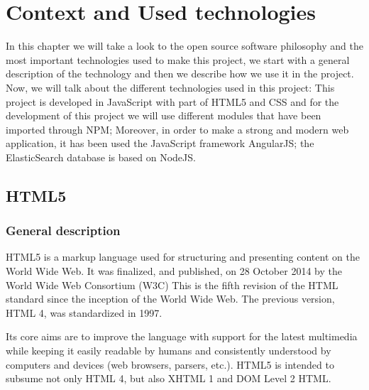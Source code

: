\documentclass[a4paper, 12pt]{book}
\begin{document}


\chapter{Context and Used technologies}

In this chapter we will take a look to the open source software philosophy and the most important technologies used to make this project, we start with a general description of the technology and then we describe how we use it in the project. Now, we will talk about the different technologies used in this project: This project is developed in JavaScript with part of HTML5 and CSS and for the development of this project we will use different modules that have been imported through NPM; Moreover, in order to make a strong and modern web application, it has been used the JavaScript framework AngularJS; the ElasticSearch database is based on NodeJS.

\section{HTML5}
\label{sec:html5}
\subsection{General description}
\label{sec:html5gd}
HTML5 is a markup language used for structuring and presenting content on the World Wide Web. It was finalized, and published, on 28 October 2014 by the World Wide Web Consortium (W3C) This is the fifth revision of the HTML standard since the inception of the World Wide Web. The previous version, HTML 4, was standardized in 1997.

Its core aims are to improve the language with support for the latest multimedia while keeping it easily readable by humans and consistently understood by computers and devices (web browsers, parsers, etc.). HTML5 is intended to subsume not only HTML 4, but also XHTML 1 and DOM Level 2 HTML.
\end{document}
